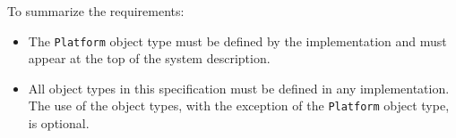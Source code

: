 \documentclass[12pt]{report} %
\providecommand{\DIFdelbegin}{} %
\newcommand{\DIFscaledelfig}{0.5}
\newlength{\DIFdelgraphicswidth} %
\newlength{\DIFdelgraphicsheight} %
\newcommand{\DIFdelincludegraphics}[2][]{%
\sbox{\DIFdelgraphicsbox}{\DIFOincludegraphics[#1]{#2}}%
\settoboxwidth{\DIFdelgraphicswidth}{\DIFdelgraphicsbox} %
\settoboxtotalheight{\DIFdelgraphicsheight}{\DIFdelgraphicsbox} %
\scalebox{\DIFscaledelfig}{%
\parbox[b]{\DIFdelgraphicswidth}{\usebox{\DIFdelgraphicsbox}\\[-\baselineskip] \rule{\DIFdelgraphicswidth}{0em}}\llap{\resizebox{\DIFdelgraphicswidth}{\DIFdelgraphicsheight}{%
\setlength{\unitlength}{\DIFdelgraphicswidth}%
\begin{picture}(1,1)%
\thicklines\linethickness{2pt} %
{\color[rgb]{1,0,0}\put(0,0){\framebox(1,1){}}}%
{\color[rgb]{1,0,0}\put(0,0){\line( 1,1){1}}}%
{\color[rgb]{1,0,0}\put(0,1){\line(1,-1){1}}}%
\end{picture}%
}\hspace*{3pt}}} %
} %
\DeclareRobustCommand{\DIFdelbegin}{\DIFOdelbegin \let\includegraphics\DIFdelincludegraphics} %
\begin{document}
To summarize the requirements:
\begin{itemize}[noitemsep,nolistsep] %
	\item{
	The \texttt{Platform} object type must be defined by the implementation and must appear at the top of the system description.
	}
	\item{
	All object types in this specification must be defined in any implementation. The use of the object types, with the exception of the \texttt{Platform} object type, is optional.
	}
	\DIFdelbegin %



\end{itemize}
\end{document}
